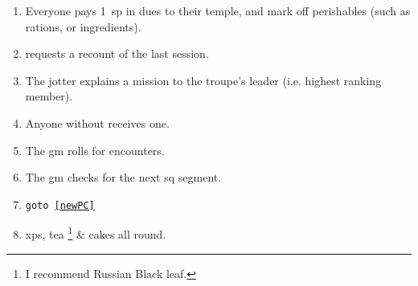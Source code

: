 
\begin{enumerate}
  \item
  Everyone pays 1~\gls{sp} in dues to their temple, and mark off perishables (such as rations, or \glspl{ingredient}).
  \item
   requests a recount of the last session.
  \item
  The \gls{jotter} explains a mission to the troupe's leader (i.e. highest ranking member).
  \item
  Anyone without  receives one.
  \label{newPC}
  \item
  The \gls{gm} rolls for encounters.
  \label{gmRollsEncounters}
  \item
  The \gls{gm} checks for the next \gls{sq} \gls{segment}.
  \item
  {\tt goto \ref{newPC}}
  \item
  \Glspl{xp}, tea %
  \ifodd\value{r3}\else\footnote{I recommend Russian Black leaf.}\fi
  \& cakes all round.
\end{enumerate}

